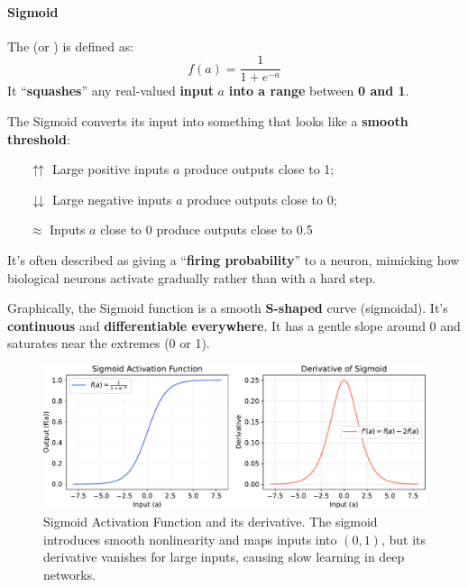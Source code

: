 \paragraph{Sigmoid}

The  (or ) is defined as:
\begin{equation}
    f(a) = \dfrac{1}{1 + e^{-a}}
\end{equation}
It ``\textbf{squashes}'' any real-valued \textbf{input} $a$ \textbf{into a range} between \textbf{0 and 1}.

\highspace
The Sigmoid converts its input into something that looks like a \textbf{smooth threshold}:
\begin{itemize}
    \item[\textcolor{Green3}{$\boldsymbol{\upuparrows}$}] Large positive inputs $a$ produce outputs close to 1;
    \item[\textcolor{Red2}{$\boldsymbol{\downdownarrows}$}] Large negative inputs $a$ produce outputs close to 0;
    \item[\textcolor{DarkOrange3}{$\boldsymbol{\approx}$}] Inputs $a$ close to 0 produce outputs close to 0.5
\end{itemize}
It's often described as giving a ``\textbf{firing probability}'' to a neuron, mimicking how biological neurons activate gradually rather than with a hard step.

\highspace
Graphically, the Sigmoid function is a smooth \textbf{S-shaped} curve (sigmoidal). It's \textbf{continuous} and \textbf{differentiable everywhere}. It has a gentle slope around $0$ and saturates near the extremes (0 or 1).

\begin{figure}[!htp]
    \centering
    \includegraphics[width=\textwidth]{img/fnns/sigmoid.pdf}
    \caption{Sigmoid Activation Function and its derivative. The sigmoid introduces smooth nonlinearity and maps inputs into $(0,1)$, but its derivative vanishes for large inputs, causing slow learning in deep networks.}
    \label{fig:sigmoid-activation-function}
\end{figure}

